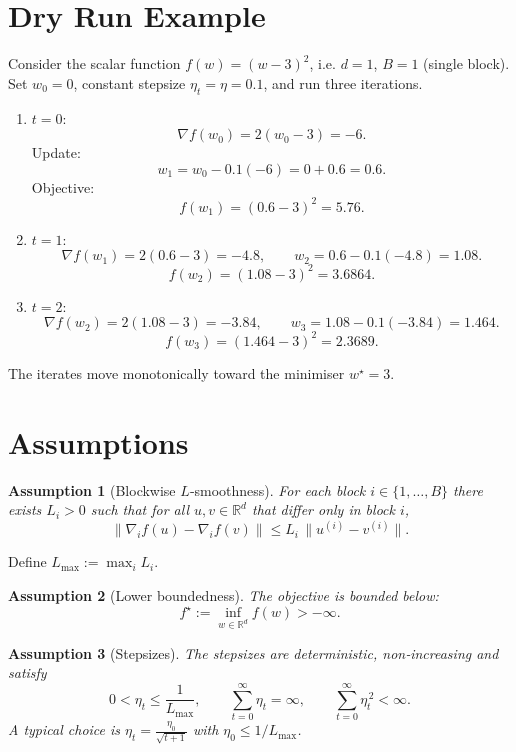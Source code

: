 \documentclass{article}
\newtheorem{assumption}{Assumption}
\newcommand{\R}{\mathbb{R}}
\begin{document}
\section*{Dry Run Example}
Consider the scalar function $f(w)=(w-3)^2$, i.e. $d=1$, $B=1$ (single block).  
Set $w_0=0$, constant stepsize $\eta_t=\eta=0.1$, and run three iterations.

\begin{enumerate}[label=Iteration \arabic*:, leftmargin=*]
\item $t=0$: 
\[
\nabla f(w_0)=2(w_0-3) = -6.
\]
Update:
\[
w_1 = w_0 - 0.1(-6)=0+0.6=0.6.
\]
Objective:
\[
f(w_1)=(0.6-3)^2=5.76.
\]

\item $t=1$:
\[
\nabla f(w_1)=2(0.6-3)=-4.8,\qquad 
w_2 = 0.6-0.1(-4.8)=1.08.
\]
\[
f(w_2)=(1.08-3)^2=3.6864.
\]

\item $t=2$:
\[
\nabla f(w_2)=2(1.08-3)=-3.84,\qquad 
w_3 = 1.08-0.1(-3.84)=1.464.
\]
\[
f(w_3)=(1.464-3)^2=2.3689.
\]
\end{enumerate}
The iterates move monotonically toward the minimiser $w^\star=3$.

\newpage

\section*{Assumptions}
\begin{assumption}[Blockwise $L$‑smoothness]\label{ass:Lsmooth}
For each block $i\in\{1,\dots ,B\}$ there exists $L_i>0$ such that for all
$u,v\in\R^{d}$ that differ only in block $i$,
\[
\big\|\nabla_i f(u)-\nabla_i f(v)\big\| \le L_i\,
\big\|u^{(i)}-v^{(i)}\big\|.
\]
\end{assumption}
Define $L_{\max}:=\max_i L_i$.

\begin{assumption}[Lower boundedness]\label{ass:lower}
The objective is bounded below:
\[
f^\star:=\inf_{w\in\R^{d}} f(w) > -\infty .
\]
\end{assumption}

\begin{assumption}[Stepsizes]\label{ass:stepsize}
The stepsizes are deterministic, non‑increasing and satisfy
\[
0<\eta_t\le \frac{1}{L_{\max}},\qquad
\sum_{t=0}^{\infty}\eta_t = \infty,\qquad
\sum_{t=0}^{\infty}\eta_t^{\,2}<\infty .
\]
A typical choice is $\eta_t=\frac{\eta_0}{\sqrt{t+1}}$ with
$\eta_0\le 1/L_{\max}$.
\end{assumption}
\end{document}
